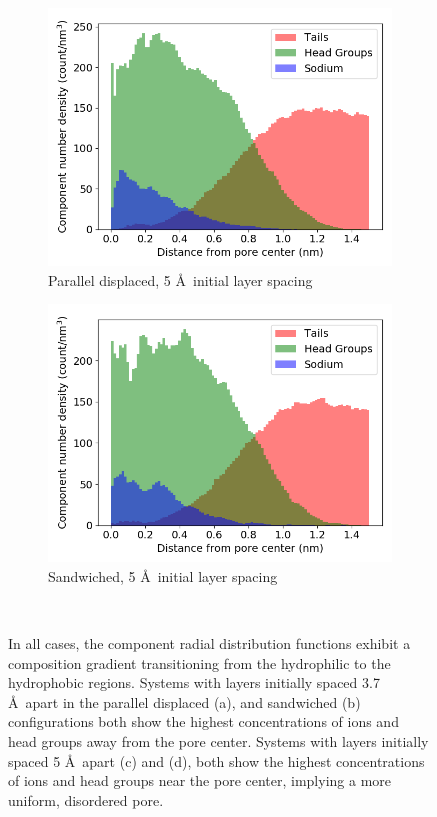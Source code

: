 \documentclass{article}
\begin{document}
\begin{figure}
\begin{subfigure}{0.45\textwidth}
        \includegraphics[width=1\linewidth]{disordered_offset_density.png}
        \caption{Parallel displaced, 5 \AA~initial layer spacing}
        \label{fig:disordered_offset_density}
  \end{subfigure}
  \begin{subfigure}{0.45\textwidth}
        \includegraphics[width=1\linewidth]{disordered_density.png}
        \caption{Sandwiched, 5 \AA~initial layer spacing}
        \label{fig:disorder_layered_density}
  \end{subfigure}
  \caption{In all cases, the component radial distribution functions exhibit a
	  composition gradient transitioning from the hydrophilic to the hydrophobic
	  regions. Systems with layers initially spaced 3.7 \AA~apart in the  parallel
	  displaced (a), and sandwiched (b) configurations both show the highest
	  concentrations of ions and head groups away from the pore center. Systems with
	  layers initially spaced 5 \AA~apart (c) and (d), both show the highest
	  concentrations of ions and head groups near the pore center, implying a more
	  uniform, disordered pore.  }~\label{fig:densities}
  \end{figure}
\end{document}

